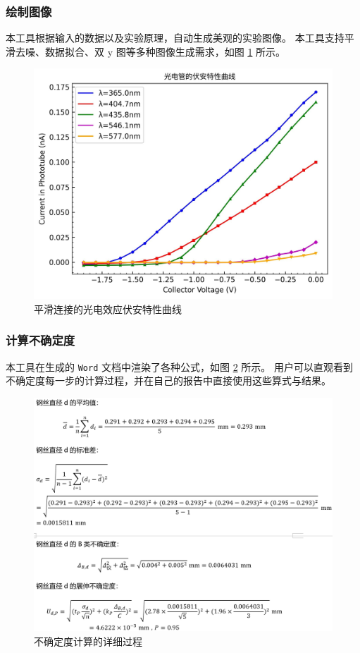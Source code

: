 \subsubsection*{绘制图像}

本工具根据输入的数据以及实验原理，自动生成美观的实验图像。
本工具支持平滑去噪、数据拟合、双 y 图等多种图像生成需求，如图 \ref{fig:draw} 所示。

\begin{figure}[htbp]
  \centering
  \includegraphics[width=\columnwidth]{figure/draw.jpg}
  \caption{平滑连接的光电效应伏安特性曲线}
  \label{fig:draw}
\end{figure}

\subsubsection*{计算不确定度}

本工具在生成的 \verb|Word| 文档中渲染了各种公式，如图 \ref{fig:calc} 所示。
用户可以直观看到不确定度每一步的计算过程，并在自己的报告中直接使用这些算式与结果。

\begin{figure}[htbp]
  \centering
  \includegraphics[width=\columnwidth]{figure/calc.png}
  \caption{不确定度计算的详细过程}
  \label{fig:calc}
\end{figure}

